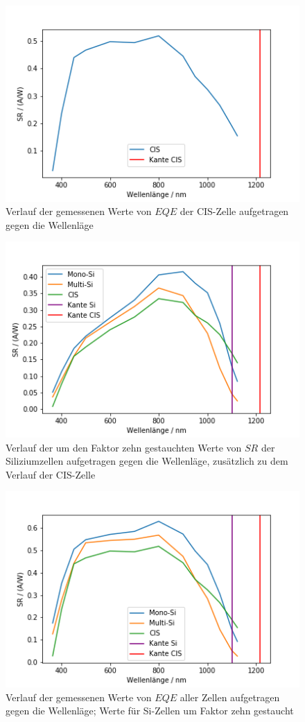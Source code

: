 \begin{figure}[h]
    \centering
    \includegraphics[scale=0.75]{Bilder/32_CIS_EQE.png}
    \caption{Verlauf der gemessenen Werte von $EQE$ der CIS-Zelle aufgetragen gegen die Wellenläge}
    \label{bild:CISEQE}
\end{figure}

\begin{figure}[h]
    \centering
    \includegraphics[scale=0.75]{Bilder/32_all_SR_gest.png}
    \caption{Verlauf der um den Faktor zehn gestauchten Werte von $SR$ der Siliziumzellen aufgetragen gegen die Wellenläge, zusätzlich
    zu dem Verlauf der CIS-Zelle}
    \label{bild:allSRgest}
\end{figure}

\begin{figure}[h]
    \centering
    \includegraphics[scale=0.75]{Bilder/32_all_EQE_gest.png}
    \caption{Verlauf der gemessenen Werte von $EQE$ aller Zellen aufgetragen gegen die Wellenläge; Werte für Si-Zellen um Faktor
    zehn gestaucht}
    \label{bild:allEQEgest}
\end{figure}

